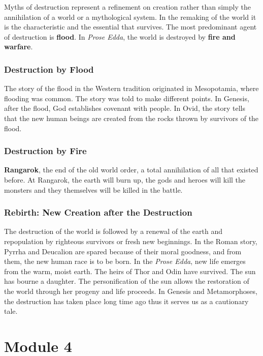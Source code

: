 \documentclass{article}
\begin{document}
Myths of destruction represent a refinement on creation rather than simply the annihilation of a world or a mythological system. In the remaking of the world it is the characteristic and the essential that survives. The most predominant agent of destruction is \textbf{flood}. In \textit{Prose Edda}, the world is destroyed by \textbf{fire and warfare}.

\subsubsection{Destruction by Flood}

The story of the flood in the Western tradition originated in Mesopotamia, where flooding was common. The story was told to make different points. In Genesis, after the flood, God establishes covenant with people. In Ovid, the story tells that the new human beings are created from the rocks thrown by survivors of the flood.

\subsubsection{Destruction by Fire}

\textbf{Rangarok}, the end of the old world order, a total annihilation of all that existed before. At Rangarok, the earth will burn up, the gods and heroes will kill the monsters and they themselves will be killed in the battle.

\subsubsection{Rebirth: New Creation after the Destruction}

The destruction of the world is followed by a renewal of the earth and repopulation by righteous survivors or fresh new beginnings. In the Roman story, Pyrrha and Deucalion are spared because of their moral goodness, and from them, the new human race is to be born. In the \textit{Prose Edda}, new life emerges from the warm, moist earth. The heirs of Thor and Odin have survived. The sun has bourne a daughter. The personification of the sun allows the restoration of the world through her progeny and life proceeds. In Genesis and Metamorphoses, the destruction has taken place long time ago thus it serves us as a cautionary tale.

\section{Module 4}
\end{document}
